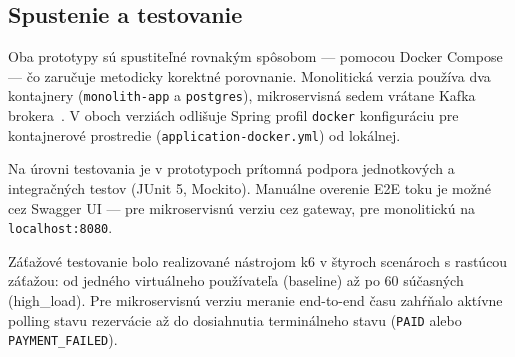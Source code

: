 \subsection{Spustenie a testovanie}

Oba prototypy sú spustiteľné rovnakým spôsobom — pomocou Docker Compose — čo zaručuje metodicky korektné porovnanie. Monolitická verzia používa dva kontajnery (\texttt{monolith-app} a \texttt{postgres}), mikroservisná sedem vrátane Kafka brokera~\cite{DockerCompose2025}. V oboch verziách odlišuje Spring profil \texttt{docker} konfiguráciu pre kontajnerové prostredie (\texttt{application-docker.yml}) od lokálnej.

Na úrovni testovania je v prototypoch prítomná podpora jednotkových a integračných testov (JUnit 5, Mockito). Manuálne overenie E2E toku je možné cez Swagger UI — pre mikroservisnú verziu cez gateway, pre monolitickú na \texttt{localhost:8080}.

Záťažové testovanie bolo realizované nástrojom k6 v štyroch scenároch s rastúcou záťažou: od jedného virtuálneho používateľa (baseline) až po 60 súčasných (high\_load). Pre mikroservisnú verziu meranie end-to-end času zahŕňalo aktívne polling stavu rezervácie až do dosiahnutia terminálneho stavu (\texttt{PAID} alebo \texttt{PAYMENT\_FAILED}).
